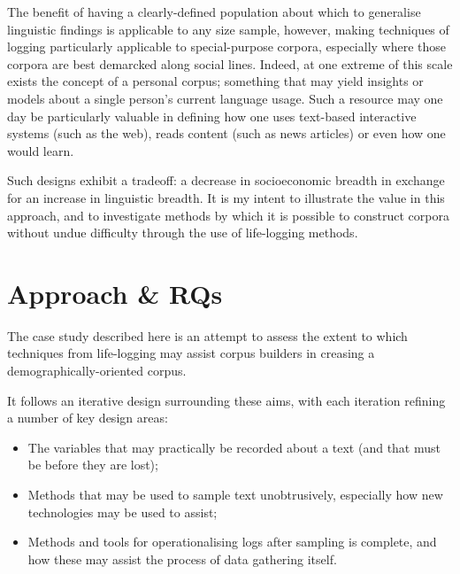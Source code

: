 The benefit of having a clearly-defined population about which to generalise linguistic findings is applicable to any size sample, however, making techniques of logging particularly applicable to special-purpose corpora, especially where those corpora are best demarcked along social lines.  Indeed, at one extreme of this scale exists the concept of a personal corpus; something that may yield insights or models about a single person's current language usage.  Such a resource may one day be particularly valuable in defining how one uses text-based interactive systems (such as the web), reads content (such as news articles) or even how one would learn.

Such designs exhibit a tradeoff: a decrease in socioeconomic breadth in exchange for an increase in linguistic breadth.  It is my intent to illustrate the value in this approach, and to investigate methods by which it is possible to construct corpora without undue difficulty through the use of life-logging methods.




















\section{Approach \& RQs}
The case study described here is an attempt to assess the extent to which techniques from life-logging may assist corpus builders in creasing a demographically-oriented corpus.

It follows an iterative design surrounding these aims, with each iteration refining a number of key design areas:

\begin{itemize}
    \item The variables that may practically be recorded about a text (and that must be before they are lost);
    \item Methods that may be used to sample text unobtrusively, especially how new technologies may be used to assist;
    \item Methods and tools for operationalising logs after sampling is complete, and how these may assist the process of data gathering itself.
\end{itemize}

